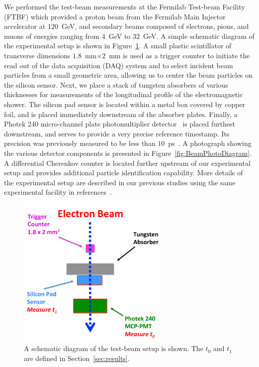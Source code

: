 We performed the test-beam measurements at the Fermilab Test-beam Facility
(FTBF) which provided a proton beam from the Fermilab Main Injector accelerator
at $120$~GeV, and secondary beams composed of electrons, pions, and muons of
energies ranging from $4$~GeV to $32$~GeV. A simple schematic diagram of the
experimental setup is shown in Figure~\ref{fig:BeamSchematicDiagram}. A small
plastic scintillator of transverse dimensions $1.8$~mm$\times 2$~mm is used as a
trigger counter to initiate the read out of the data acquisition (DAQ) system
and to select incident beam particles from a small geometric area, allowing us to center the 
beam particles on the silicon sensor. Next, we place a stack of tungsten absorbers of various thicknesses for
measurements of the longitudinal profile of the electromagnetic shower. The
silicon pad sensor is located within a metal box covered by copper foil, and is
placed immediately downstream of the absorber plates. Finally, a Photek 240
micro-channel plate photomultiplier detector~\cite{Anderson:2015gha,
MCPFastCaloNIMA, Ronzhin2015288,Ronzhin201552} is placed furthest downstream,
and serves to provide a very precise reference timestamp. Its precision was
previously measured to be less than $10$~ps~\cite{Ronzhin2015288}. 
A photograph showing the various
detector components is presented in Figure~\ref{fig:BeamPhotoDiagram}. A
differential Cherenkov counter is located further upstream of our experimental
setup and provides additional particle identification capability. More
details of the experimental setup are described in our previous studies using
the same experimental facility in references~\cite{Anderson:2015gha,
MCPFastCaloNIMA, Ronzhin2015288,Ronzhin201552}.

\begin{figure}[htbp] 
\centering
\includegraphics[width=0.65\textwidth]{plots/BeamSchematicDiagram.pdf} 
\caption{A schematic diagram of the test-beam setup is shown. The $t_0$ and $t_1$ are defined in Section~\ref{sec:results}.} 
\label{fig:BeamSchematicDiagram} 
\end{figure} 

